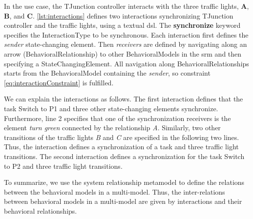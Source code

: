 \documentclass{jot}
\begin{document}
In the use case, the TJunction controller interacts with the three traffic lights, \textbf{A}, \textbf{B}, and \textbf{C}.
\autoref{lst:interactions} defines two interactions synchronizing TJunction controller and the traffic lights, using a textual \gls*{dsl}.
The \textbf{synchronize} keyword specifies the \textsf{InteractionType} to be \textsf{synchronous}.
Each interaction first defines the \textit{sender} state-changing element.
Then \textit{receivers} are defined by navigating along an arrow (\textsf{BehavioralRelationship}) to other \textsf{BehavioralModel}s in the \gls*{srm} and then specifying a \textsf{StateChangingElement}.
All navigation along \textsf{BehavioralRelationship}s starts from the \textsf{BehavioralModel} containing the \textit{sender}, so constraint \eqref{eq:interactionConstraint} is fulfilled.



We can explain the interactions as follows.
The first interaction defines that the task \textsf{Switch to P1} and three other state-changing elements synchronize.
Furthermore, line 2 specifies that one of the synchronization receivers is the element \emph{turn green} connected by the relationship \emph{A}.
Similarly, two other transitions of the traffic lights \emph{B} and \emph{C} are specified in the following two lines.
Thus, the interaction defines a synchronization of a task and three traffic light transitions. 
The second interaction defines a synchronization for the task \textsf{Switch to P2} and three traffic light transitions.

To summarize, we use the system relationship metamodel to define the relations between the behavioral models in a multi-model.
Thus, the inter-relations between behavioral models in a multi-model are given by interactions and their behavioral relationships.
\end{document}
